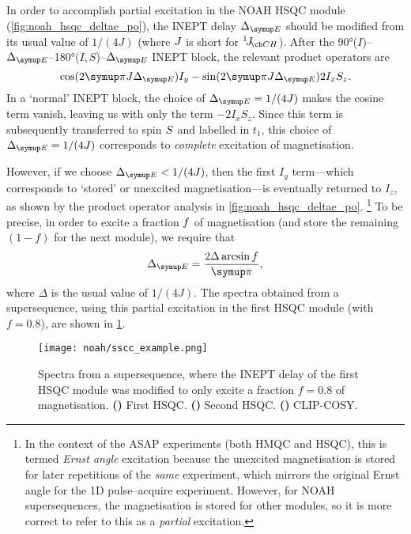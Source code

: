 In order to accomplish partial  excitation in the NOAH HSQC module (\cref{fig:noah_hsqc_deltae_po}), the INEPT delay $\DeltaE$ should be modified from its usual value of $1 / (4J)$ (where $J\/$ is short for $\oneJ{CH}$).
After the \ang{90}($I$)--$\DeltaE$--\ang{180}($I,S$)--$\DeltaE$ INEPT block, the relevant product operators are
\begin{equation}
    \label{eq:inept_changed}
    \cos(2\cpi J\DeltaE) I_y - \sin(2\cpi J\DeltaE) 2I_xS_z.
\end{equation}
In a `normal' INEPT block, the choice of $\DeltaE = 1/(4J)$ makes the cosine term vanish, leaving us with only the term $-2I_xS_z$.
Since this term is subsequently transferred to spin $S\/$ and labelled in $t_1$, this choice of $\DeltaE = 1/(4J)$ corresponds to \textit{complete} excitation of  magnetisation.

However, if we choose $\DeltaE < 1/(4J)$, then the first $I_y$ term---which corresponds to `stored' or unexcited  magnetisation---is eventually returned to $I_z$, as shown by the product operator analysis in \cref{fig:noah_hsqc_deltae_po}.%
\footnote{In the context of the ASAP experiments (both HMQC and HSQC), this is termed \textit{Ernst angle} excitation because the unexcited magnetisation is stored for later repetitions of the \textit{same} experiment, which mirrors the original Ernst angle for the 1D pulse--acquire experiment.
However, for NOAH supersequences, the magnetisation is stored for other modules, so it is more correct to refer to this as a \textit{partial} excitation.}
To be precise, in order to excite a fraction $f\/$ of  magnetisation (and store the remaining $(1 - f)$ for the next module), we require that
\begin{equation}
    \label{eq:ssc_inept_delay}
    \DeltaE = \frac{2\Delta \arcsin f}{\cpi},
\end{equation}
where $\Delta$ is the usual value of $1/(4J)$.
The spectra obtained from a  supersequence, using this partial  excitation in the first HSQC module (with $f = 0.8$), are shown in \cref{fig:sscc_example}.

\begin{figure}[!ht]
    \centering
    \texttt{[image: noah/sscc\_example.png]}%
    {\label{fig:sscc_example_s1}}%
    {\label{fig:sscc_example_s2}}%
    {\label{fig:sscc_example_cc}}%
    \caption[Spectra from  supersequence]{
        Spectra from a  supersequence, where the INEPT delay of the first HSQC module was modified to only excite a fraction $f = 0.8$ of  magnetisation.
        \textbf{()} First HSQC.
        \textbf{()} Second HSQC.
        \textbf{()} CLIP-COSY.
    }
    \label{fig:sscc_example}
\end{figure}

